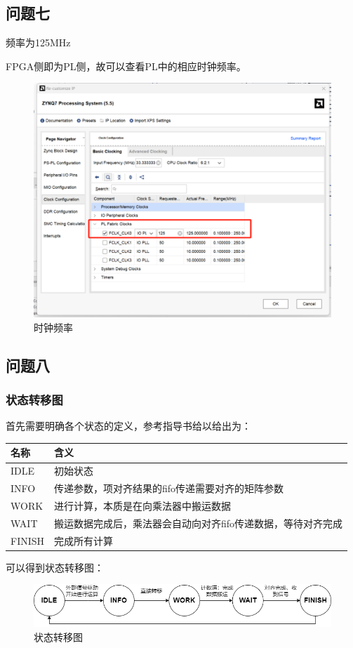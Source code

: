 \documentclass[12pt,a4paper]{article}
\begin{document}
\subsection{问题七}

频率为125MHz

FPGA侧即为PL侧，故可以查看PL中的相应时钟频率。

\begin{figure}[htbp]
    \centering
    \includegraphics[width=0.6\linewidth]{img/f_7.png}
    \caption{时钟频率}
\end{figure}

\subsection{问题八}

\subsubsection{状态转移图}

首先需要明确各个状态的定义，参考指导书给以给出为：

\begin{longtable}[]{@{}ll@{}}
\toprule\noalign{}
名称 & 含义 \\
\midrule\noalign{}
\endhead
\bottomrule\noalign{}
\endlastfoot
IDLE & 初始状态 \\
INFO & 传递参数，项对齐结果的fifo传递需要对齐的矩阵参数 \\
WORK & 进行计算，本质是在向乘法器中搬运数据 \\
WAIT & 搬运数据完成后，乘法器会自动向对齐fifo传递数据，等待对齐完成 \\
FINISH & 完成所有计算 \\
\end{longtable}

可以得到状态转移图：

\begin{figure}[htbp]
    \centering
    \includegraphics[width=0.8\linewidth]{img/dfa.png}
    \caption{状态转移图}
\end{figure}
\end{document}
